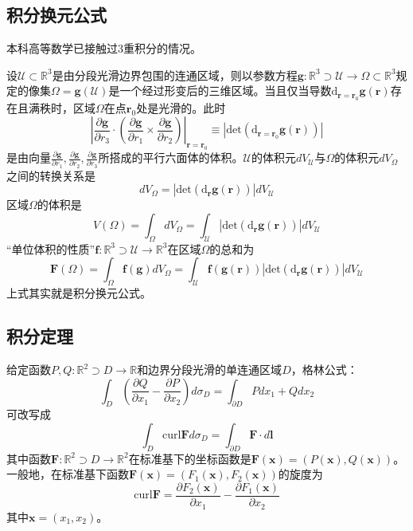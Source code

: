 \documentclass[main.tex]{subfiles}
\begin{document}
\subsection{积分换元公式}
本科高等数学已接触过3重积分的情况\cite[\S 8.3“五”]{华工高数2009下}。

设$\mathcal{U}\subset\mathbb{R}^3$是由分段光滑边界包围的连通区域，则以参数方程$\mathbf{g}:\mathbb{R}^3\supset \mathcal{U}\rightarrow\Omega\subset\mathbb{R}^3$规定的像集$\Omega=\mathbf{g}\left(\mathcal{U}\right)$是一个经过形变后的三维区域。当且仅当导数$\mathrm{d}_{\mathbf{r}=\mathbf{r}_0}\mathbf{g}\left(\mathbf{r}\right)$存在且满秩时，区域$\Omega$在点$\mathbf{r}_0$处是光滑的。此时
\[
    \left|\frac{\partial \mathbf{g}}{\partial r_3}\cdot\left(\frac{\partial\mathbf{g}}{\partial r_1}\times\frac{\partial\mathbf{g}}{\partial r_2}\right)\right|_{\mathbf{r}=\mathbf{r}_0}\equiv\left|\mathrm{det}\left(\mathrm{d}_{\mathbf{r}=\mathbf{r}_0}\mathbf{g}\left(\mathbf{r}\right)\right)\right|
\]
是由向量$\frac{\partial\mathbf{g}}{\partial r_1},\frac{\partial\mathbf{g}}{\partial r_2},\frac{\partial\mathbf{g}}{\partial r_3}$所搭成的平行六面体的体积。$\mathcal{U}$的体积元$dV_\mathcal{U}$与$\Omega$的体积元$dV_\Omega$之间的转换关系是
\[dV_\Omega=\left|\mathrm{det}\left(\mathrm{d}_{\mathbf{r}}\mathbf{g}\left(\mathbf{r}\right)\right)\right|
    dV_\mathcal{U}\]
区域$\Omega$的体积是
\[
    V\left(\Omega\right)=\int_\Omega dV_\Omega=\int_\mathcal{U}\left|\mathrm{det}\left(\mathrm{d}_{\mathbf{r}}\mathbf{g}\left(\mathbf{r}\right)\right)\right|dV_\mathcal{U}
\]
“单位体积的性质”$\mathbf{f}:\mathbb{R}^3\supset\mathcal{U}\rightarrow\mathbb{R}^3$在区域$\Omega$的总和为
\[
    \mathbf{F}\left(\Omega\right)=\int_\Omega\mathbf{f}\left(\mathbf{g}\right)dV_\Omega=\int_\mathcal{U}\mathbf{f}\left(\mathbf{g}\left(\mathbf{r}\right)\right)\left|\mathrm{det}\left(\mathrm{d}_{\mathbf{r}}\mathbf{g}\left(\mathbf{r}\right)\right)\right|dV_\mathcal{U}
\]
上式其实就是积分换元公式。

\subsection{积分定理}
给定函数$P,Q:\mathbb{R}^2\supset D\rightarrow\mathbb{R}$和边界分段光滑的单连通区域$D$，格林公式：
\[\int_D\left(\frac{\partial Q}{\partial x_1}-\frac{\partial P}{\partial x_2}\right)d\sigma_D=\int_{\partial D}Pdx_1+Qdx_2
\]
可改写成
\[
    \int_D\mathrm{curl}\mathbf{F}d\sigma_D=\int_{\partial D}\mathbf{F}\cdot d\mathbf{l}
\]
其中函数$\mathbf{F}:\mathbb{R}^2\supset D\rightarrow\mathbb{R}^2$在标准基下的坐标函数是$\mathbf{F}\left(\mathbf{x}\right)=\left(P\left(\mathbf{x}\right),Q\left(\mathbf{x}\right)\right)$。一般地，在标准基下函数$\mathbf{F}\left(\mathbf{x}\right)=\left(F_1\left(\mathbf{x}\right),F_2\left(\mathbf{x}\right)\right)$的旋度为
\[\mathrm{curl}\mathbf{F}=\frac{\partial F_2\left(\mathbf{x}\right)}{\partial x_1}-\frac{\partial F_1\left(\mathbf{x}\right)}{\partial x_2}\]
其中$\mathbf{x}=\left(x_1,x_2\right)$。
\end{document}
